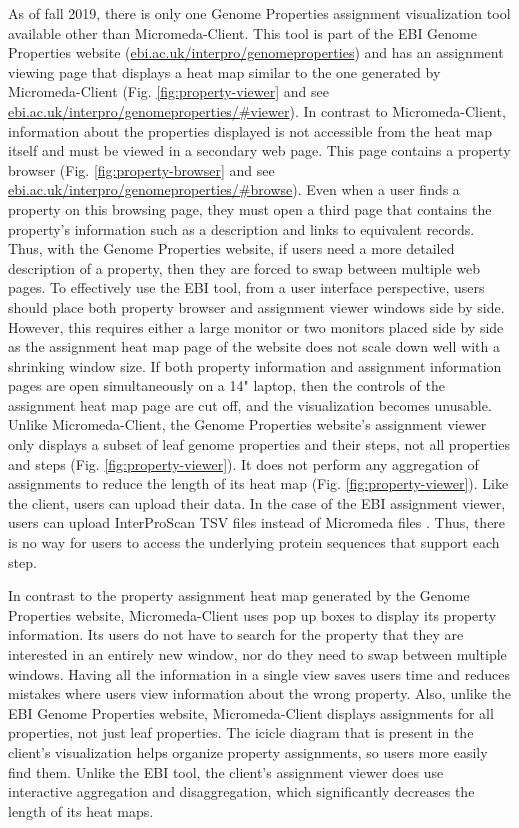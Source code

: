 As of fall 2019, there is only one Genome Properties assignment visualization tool available other than Micromeda-Client. This tool is part of the EBI Genome Properties website \cite{richardson2018genome} (\href{ebi.ac.uk/interpro/genomeproperties}{ebi.ac.uk/interpro/genomeproperties}) and has an assignment viewing page that displays a heat map similar to the one generated by Micromeda-Client \cite{richardson2018genome}  (Fig. \ref{fig:property-viewer} and see \href{ebi.ac.uk/interpro/genomeproperties/\#viewer}{ebi.ac.uk/interpro/genomeproperties/\#viewer}). In contrast to Micromeda-Client, information about the properties displayed is not accessible from the heat map itself and must be viewed in a secondary web page. This page contains a property browser (Fig. \ref{fig:property-browser} and see \href{ebi.ac.uk/interpro/genomeproperties/\#browse}{ebi.ac.uk/interpro/genomeproperties/\#browse}). Even when a user finds a property on this browsing page, they must open a third page that contains the property's information such as a description and links to equivalent records. Thus, with the Genome Properties website, if users need a more detailed description of a property, then they are forced to swap between multiple web pages. To effectively use the EBI tool, from a user interface perspective, users should place both property browser and assignment viewer windows side by side. However, this requires either a large monitor or two monitors placed side by side as the assignment heat map page of the website does not scale down well with a shrinking window size. If both property information and assignment information pages are open simultaneously on a 14" laptop, then the controls of the assignment heat map page are cut off, and the visualization becomes unusable. Unlike Micromeda-Client, the Genome Properties website's assignment viewer only displays a subset of leaf genome properties and their steps, not all properties and steps (Fig. \ref{fig:property-viewer}). It does not perform any aggregation of assignments to reduce the length of its heat map (Fig. \ref{fig:property-viewer}). Like the client, users can upload their data. In the case of the EBI assignment viewer, users can upload InterProScan TSV files instead of Micromeda files \cite{richardson2018genome}. Thus, there is no way for users to access the underlying protein sequences that support each step.

In contrast to the property assignment heat map generated by the Genome Properties website, Micromeda-Client uses pop up boxes to display its property information. Its users do not have to search for the property that they are interested in an entirely new window, nor do they need to swap between multiple windows. Having all the information in a single view saves users time and reduces mistakes where users view information about the wrong property. Also, unlike the EBI Genome Properties website, Micromeda-Client displays assignments for all properties, not just leaf properties. The icicle diagram that is present in the client's visualization helps organize property assignments, so users more easily find them. Unlike the EBI tool, the client's assignment viewer does use interactive aggregation and disaggregation, which significantly decreases the length of its heat maps.

